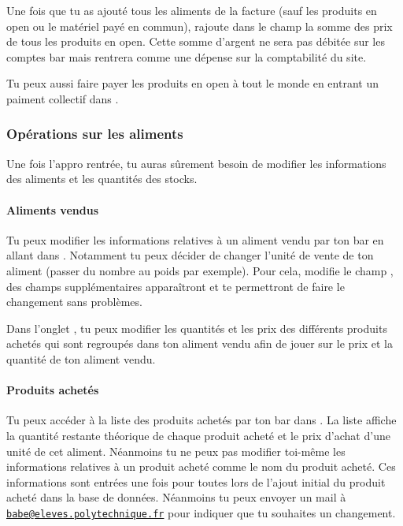 \documentclass[12pt,french]{article}
\begin{document}
Une fois que tu as ajouté tous les aliments de la facture (sauf les produits en open ou le matériel payé en commun), rajoute dans le champ  la somme des prix de tous les produits en open. Cette somme d'argent ne sera pas débitée sur les comptes bar mais rentrera comme une dépense sur la comptabilité du site.

Tu peux aussi faire payer les produits en open à tout le monde en entrant un paiment collectif dans .

\subsubsection{Opérations sur les aliments}

Une fois l'appro rentrée, tu auras sûrement besoin de modifier les informations des aliments et les quantités des stocks.

\paragraph{Aliments vendus} Tu peux modifier les informations relatives à un aliment vendu par ton bar en allant dans . Notamment tu peux décider de changer l'unité de vente de ton aliment (passer du nombre au poids par exemple). Pour cela, modifie le champ , des champs supplémentaires apparaîtront et te permettront de faire le changement sans problèmes.

Dans l'onglet , tu peux modifier les quantités et les prix des différents produits achetés qui sont regroupés dans ton aliment vendu afin de jouer sur le prix et la quantité de ton aliment vendu.

\paragraph{Produits achetés} Tu peux accéder à la liste des produits achetés par ton bar dans . La liste affiche la quantité restante théorique de chaque produit acheté et le prix d'achat d'une unité de cet aliment. Néanmoins tu ne peux pas modifier toi-même les informations relatives à un produit acheté comme le nom du produit acheté. Ces informations sont entrées une fois pour toutes lors de l'ajout initial du produit acheté dans la base de données. Néanmoins tu peux envoyer un mail à \href{mailto:babe@eleves.polytechnique.fr}{\texttt{babe@eleves.polytechnique.fr}} pour indiquer que tu souhaites un changement.
\end{document}
